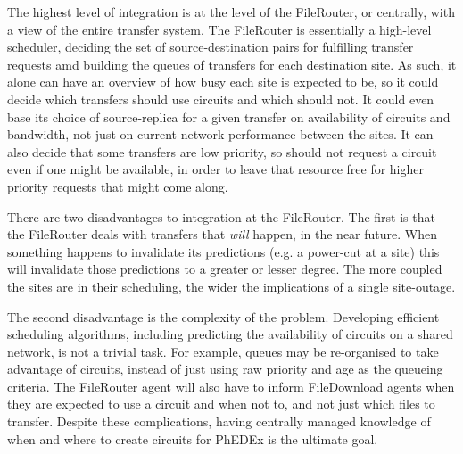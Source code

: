 The highest level of integration is at the level of the FileRouter, or centrally, with a view of the entire transfer system. The FileRouter is essentially a high-level scheduler, deciding the set of source-destination pairs for fulfilling transfer requests amd building the queues of transfers for each destination site. As such, it alone can have an overview of how busy each site is expected to be, so it could decide which transfers should use circuits and which should not. It could even base its choice of source-replica for a given transfer on availability of circuits and bandwidth, not just on current network performance between the sites. It can also decide that some transfers are low priority, so should not request a circuit even if one might be available, in order to leave that resource free for higher priority requests that might come along.

There are two disadvantages to integration at the FileRouter. The first is that the FileRouter deals with transfers that \emph{will} happen, in the near future. When something happens to invalidate its predictions (e.g. a power-cut at a site) this will invalidate those predictions to a greater or lesser degree. The more coupled the sites are in their scheduling, the wider the implications of a single site-outage.

The second disadvantage is the complexity of the problem. Developing efficient scheduling algorithms, including predicting the availability of circuits on a shared network, is not a trivial task. For example, queues may be re-organised to take advantage of circuits, instead of just using raw priority and age as the queueing criteria. The FileRouter agent will also have to inform FileDownload agents when they are expected to use a circuit and when not to, and not just which files to transfer. Despite these complications, having centrally managed knowledge of when and where to create circuits for PhEDEx is the ultimate goal.